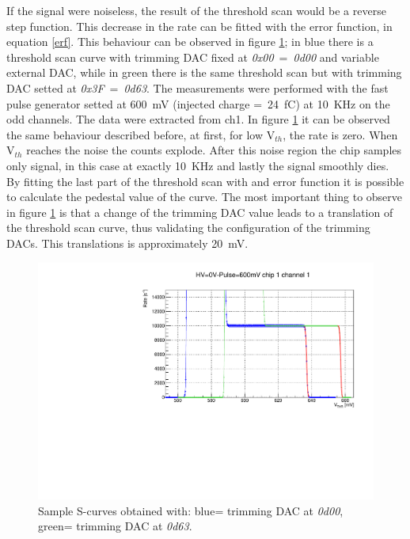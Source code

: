 If the signal were noiseless, the result of the threshold scan would be a reverse step function.
This decrease in the rate can be fitted with the error function, in equation \ref{erf}.
\newline
\noindent This behaviour can be observed in figure \ref{fig:thscanch0}; in blue there is a threshold scan curve with trimming DAC fixed at \textit{0x00}~=~\textit{0d00} and variable external DAC, while in green there is the same threshold scan but with trimming DAC setted at \textit{0x3F}~=~\textit{0d63}.
The measurements were performed with the fast pulse generator setted at 600~mV (injected charge =~24~fC) at 10~KHz on the odd channels. The data were extracted from ch1.
In figure \ref{fig:thscanch0} it can be observed the same behaviour described before, at first, for low V$_{th}$, the rate is zero.
When V$_{th}$ reaches the noise the counts explode.
After this noise region the chip samples only signal, in this case at exactly 10~KHz and lastly the signal smoothly dies. 
By fitting the last part of the threshold scan with and error function it is possible to calculate the pedestal value of the curve.
\noindent The most important thing to observe in figure \ref{fig:thscanch0} is that a change of the trimming DAC value leads to a translation of the threshold scan curve, thus validating the configuration of the trimming DACs.
This translations is approximately 20~mV.
\begin{figure}[H]
	\centering
	\includegraphics[width=0.8\linewidth]{IMG/ch5/DataDacConfig/ThScan_ch0.pdf}
	\caption{Sample S-curves obtained with: {\color{blue}blue}= trimming DAC at \textit{0d00},\\{\color{green}green}= trimming DAC at \textit{0d63}.}
	\label{fig:thscanch0}
\end{figure}

